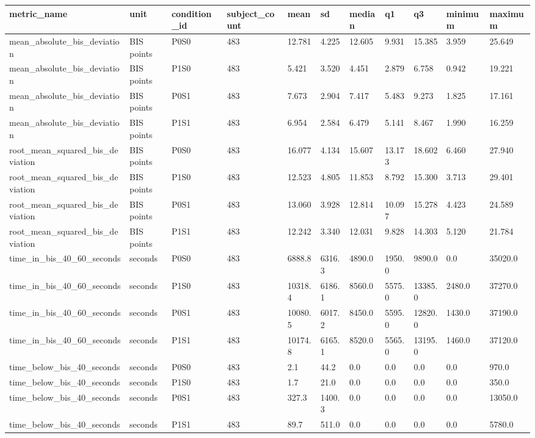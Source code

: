 \begin{tabular}{lllllllllll}
\hline
metric\_name & unit & condition\_id & subject\_count & mean & sd & median & q1 & q3 & minimum & maximum \\
\hline
mean\_absolute\_bis\_deviation & BIS points & P0S0 & 483 & 12.781 & 4.225 & 12.605 & 9.931 & 15.385 & 3.959 & 25.649 \\
mean\_absolute\_bis\_deviation & BIS points & P1S0 & 483 & 5.421 & 3.520 & 4.451 & 2.879 & 6.758 & 0.942 & 19.221 \\
mean\_absolute\_bis\_deviation & BIS points & P0S1 & 483 & 7.673 & 2.904 & 7.417 & 5.483 & 9.273 & 1.825 & 17.161 \\
mean\_absolute\_bis\_deviation & BIS points & P1S1 & 483 & 6.954 & 2.584 & 6.479 & 5.141 & 8.467 & 1.990 & 16.259 \\
root\_mean\_squared\_bis\_deviation & BIS points & P0S0 & 483 & 16.077 & 4.134 & 15.607 & 13.173 & 18.602 & 6.460 & 27.940 \\
root\_mean\_squared\_bis\_deviation & BIS points & P1S0 & 483 & 12.523 & 4.805 & 11.853 & 8.792 & 15.300 & 3.713 & 29.401 \\
root\_mean\_squared\_bis\_deviation & BIS points & P0S1 & 483 & 13.060 & 3.928 & 12.814 & 10.097 & 15.278 & 4.423 & 24.589 \\
root\_mean\_squared\_bis\_deviation & BIS points & P1S1 & 483 & 12.242 & 3.340 & 12.031 & 9.828 & 14.303 & 5.120 & 21.784 \\
time\_in\_bis\_40\_60\_seconds & seconds & P0S0 & 483 & 6888.8 & 6316.3 & 4890.0 & 1950.0 & 9890.0 & 0.0 & 35020.0 \\
time\_in\_bis\_40\_60\_seconds & seconds & P1S0 & 483 & 10318.4 & 6186.1 & 8560.0 & 5575.0 & 13385.0 & 2480.0 & 37270.0 \\
time\_in\_bis\_40\_60\_seconds & seconds & P0S1 & 483 & 10080.5 & 6017.2 & 8450.0 & 5595.0 & 12820.0 & 1430.0 & 37190.0 \\
time\_in\_bis\_40\_60\_seconds & seconds & P1S1 & 483 & 10174.8 & 6165.1 & 8520.0 & 5565.0 & 13195.0 & 1460.0 & 37120.0 \\
time\_below\_bis\_40\_seconds & seconds & P0S0 & 483 & 2.1 & 44.2 & 0.0 & 0.0 & 0.0 & 0.0 & 970.0 \\
time\_below\_bis\_40\_seconds & seconds & P1S0 & 483 & 1.7 & 21.0 & 0.0 & 0.0 & 0.0 & 0.0 & 350.0 \\
time\_below\_bis\_40\_seconds & seconds & P0S1 & 483 & 327.3 & 1400.3 & 0.0 & 0.0 & 0.0 & 0.0 & 13050.0 \\
time\_below\_bis\_40\_seconds & seconds & P1S1 & 483 & 89.7 & 511.0 & 0.0 & 0.0 & 0.0 & 0.0 & 5780.0 \\

\end{tabular}

